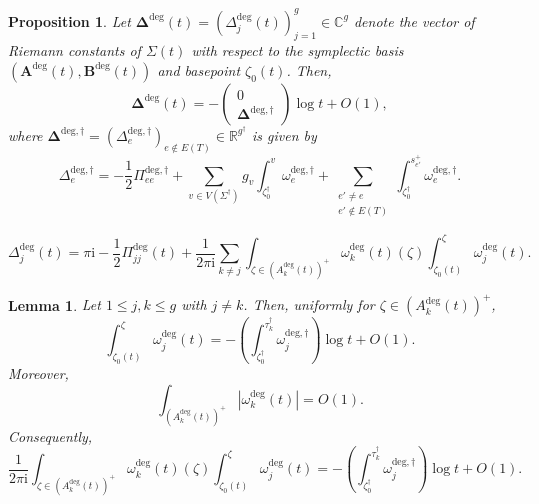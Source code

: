 \documentclass[10pt,a4paper]{amsart}
\newtheorem{proposition}{Proposition}
\newtheorem{lemma}{Lemma}
\newcommand{\C}{\mathbb{C}}
\newcommand{\R}{\mathbb{R}}
\def\RC{{\Delta}}
\def\basept{{\ptSig_0}}
\def\baseptT{{\ptSig_0^\trop}}
\def\edges{E}
\def\imunit{{\mathrm{i}}}
\def\mcurve{\Sigma}
\def\ptSig{\zeta}
\def\trop{\dagger}
\def\tropmcurve{\mcurve^\trop}
\def\vecRC{\bm{\Delta}}
\def\vertices{V}
\begin{document}
\begin{proposition}
\label{prop:riemann_constants_trop}
Let
$
\vecRC^{\mathrm{deg}}(t)
=
(\RC_j^{\mathrm{deg}}(t))_{j=1}^g
\in\C^g
$
denote the vector of Riemann constants of $\mcurve(t)$ with respect to
the symplectic basis
$
(
\bm A^{\mathrm{deg}}(t),
\bm B^{\mathrm{deg}}(t)
)
$
and basepoint $\basept(t)$. Then,
\[
\vecRC^{\mathrm{deg}}(t)
=
-
\begin{pmatrix}
0\\
\vecRC^{\mathrm{deg},\trop}
\end{pmatrix}
\log t
+
O(1),
\]
where
$
\vecRC^{\mathrm{deg},\trop}
=
(
\RC_e^{\mathrm{deg},\trop}
)_{e\notin\edges(T)}
\in
\R^{g^\trop}
$
is given by
\begin{equation}
\label{eq:RC_deg_trop}
\RC_e^{\mathrm{deg},\trop}
=
-\frac{1}{2}\Pi_{ee}^{\mathrm{deg},\trop}
+
\sum_{v\in\vertices(\tropmcurve)}
g_v
\int_{\baseptT}^{v}
\omega_e^{\mathrm{deg},\trop}
+
\sum_{\substack{
e'\neq e\\
e'\notin\edges(T)
}}
\int_{\baseptT}^{s_{e'}^+}
\omega_e^{\mathrm{deg},\trop}.
\end{equation}
\end{proposition}

\begin{equation}
\label{eq:Fay_RC_deg}
\RC_j^{\mathrm{deg}}(t)
=
\pi\imunit
-
\frac{1}{2}\Pi_{jj}^{\mathrm{deg}}(t)
+
\frac{1}{2\pi\imunit}
\sum_{k\neq j}
\int_{\zeta\in(A_k^{\mathrm{deg}}(t))^+}
\omega_k^{\mathrm{deg}}(t)(\zeta)
\int_{\basept(t)}^\zeta
\omega_j^{\mathrm{deg}}(t).
\end{equation}

\begin{lemma}
\label{lem:uniform_A_cycle_asymptotics}
Let $1\leq j,k\leq g$ with $j\neq k$. Then, uniformly for
$\zeta\in(A_k^{\mathrm{deg}}(t))^+$,
\begin{equation}
\label{eq:uniform_A_cycle_asymptotics_first}
\int_{\basept(t)}^\zeta
\omega_j^{\mathrm{deg}}(t)
=
-
\left(
\int_{\baseptT}^{\tau_k^\trop}
\omega_j^{\mathrm{deg},\trop}
\right)
\log t
+
O(1).
\end{equation}
Moreover,
\[
\int_{(A_k^{\mathrm{deg}}(t))^+}
\left|
\omega_k^{\mathrm{deg}}(t)
\right|
=
O(1).
\]
Consequently,
\[
\frac{1}{2\pi\imunit}
\int_{\zeta\in(A_k^{\mathrm{deg}}(t))^+}
\omega_k^{\mathrm{deg}}(t)(\zeta)
\int_{\basept(t)}^\zeta
\omega_j^{\mathrm{deg}}(t)
=
-
\left(
\int_{\baseptT}^{\tau_k^\trop}
\omega_j^{\mathrm{deg},\trop}
\right)
\log t
+
O(1).
\]
\end{lemma}
\end{document}
